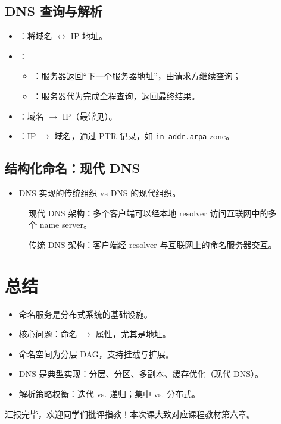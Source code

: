 \subsection{DNS 查询与解析}

\begin{itemize}
  \item {}：将域名 \(\leftrightarrow\) IP 地址。
  \item {}：
  \begin{itemize}
    \item {}：服务器返回“下一个服务器地址”，由请求方继续查询；
    \item {}：服务器代为完成全程查询，返回最终结果。
  \end{itemize}
  \item {}：域名 \(\to\) IP（最常见）。
  \item {}：IP \(\to\) 域名，通过 PTR 记录，如 \texttt{in-addr.arpa} zone。
\end{itemize}

\subsection{结构化命名：现代 DNS}

\begin{itemize}
  \item DNS 实现的传统组织 vs DNS 的现代组织。
\end{itemize}

\begin{figure}[H]
  \centering
  \caption{现代 DNS 架构：多个客户端可以经本地 resolver 访问互联网中的多个 name server。}
\end{figure}

\begin{figure}[H]
  \centering
  \caption{传统 DNS 架构：客户端经 resolver 与互联网上的命名服务器交互。}
\end{figure}

\section{总结}

\begin{itemize}
  \item 命名服务是分布式系统的基础设施。
  \item 核心问题：命名 \(\to\) 属性，尤其是地址。
  \item 命名空间为分层 DAG，支持挂载与扩展。
  \item DNS 是典型实现：分层、分区、多副本、缓存优化（现代 DNS）。
  \item 解析策略权衡：迭代 vs. 递归；集中 vs. 分布式。
\end{itemize}

汇报完毕，欢迎同学们批评指教！本次课大致对应课程教材第六章。
